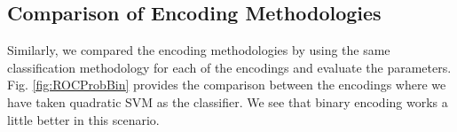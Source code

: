 \documentclass{article} %
\begin{document}
	\subsection{Comparison of Encoding Methodologies}
	
	Similarly, we compared the encoding methodologies by using the same classification methodology for each of the encodings and evaluate the parameters. Fig. \ref{fig:ROCProbBin} provides the comparison between the encodings where we have taken quadratic SVM as the classifier. We see that binary encoding works a little better in this scenario.
	
	\begin{figure}[H]
		\begin{center}

\end{center}
\end{figure}
\end{document}
